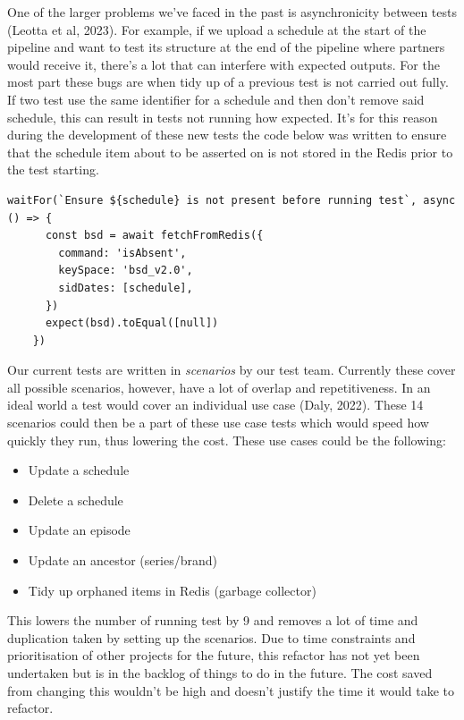   One of the larger problems we've faced in the past is asynchronicity between tests (Leotta et al, 2023). For example, if we upload a schedule at the 
  start of the pipeline and want to test its structure at the end of the pipeline where partners would receive it, there's a lot that can interfere with 
  expected outputs. For the most part these bugs are when tidy up of a previous test is not carried out fully. If two test use the same identifier 
  for a schedule and then don't remove said schedule, this can result in tests not running how expected. It's for this reason during the development 
  of these new tests the code below was written to ensure that the schedule item about to be asserted on is not stored in the Redis prior to the 
  test starting.

  \begin{lstlisting}[caption=Code to ensure schedule to asserted on is not present at the start of the test.]
    waitFor(`Ensure ${schedule} is not present before running test`, async () => {
      const bsd = await fetchFromRedis({
        command: 'isAbsent',
        keySpace: 'bsd_v2.0',
        sidDates: [schedule],
      })
      expect(bsd).toEqual([null])
    })
  \end{lstlisting} 

  Our current tests are written in \textit{scenarios} by our test team.
  Currently these cover all possible scenarios, however, have a lot of overlap and repetitiveness. In an ideal world a test would cover an individual
  use case (Daly, 2022). These 14 scenarios could then be a part of these use case tests which would speed how quickly they run, thus lowering the cost.
  These use cases could be the following:

  \begin{itemize}
    \item Update a schedule
    \item Delete a schedule
    \item Update an episode
    \item Update an ancestor (series/brand)
    \item Tidy up orphaned items in Redis (garbage collector)
  \end{itemize}

  This lowers the number of running test by 9 and removes a lot of time and duplication taken by setting up the scenarios. Due to time constraints and 
  prioritisation of other projects for the future, this refactor has not yet been undertaken but is in the backlog of things to do in the future. The 
  cost saved from changing this wouldn't be high and doesn't justify the time it would take to refactor.


